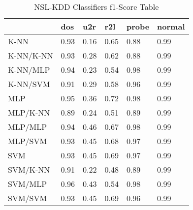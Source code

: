\begin{table}[H]
\centering
\caption{NSL-KDD Classifiers f1-Score Table}
\label{nslf1scoretable}
\begin{tabular}{@{}llllll@{}}
\toprule
          & dos  & u2r  & r2l  & probe & normal \\ \midrule
K-NN      & 0.93 & 0.16 & 0.65 & 0.88  & 0.99   \\
K-NN/K-NN & 0.93 & 0.28 & 0.62 & 0.88  & 0.99   \\
K-NN/MLP  & 0.94 & 0.23 & 0.54 & 0.98  & 0.99   \\
K-NN/SVM  & 0.91 & 0.29 & 0.58 & 0.96  & 0.99   \\
MLP       & 0.95 & 0.36 & 0.72 & 0.98  & 0.99   \\
MLP/K-NN  & 0.89 & 0.24 & 0.51 & 0.89  & 0.99   \\
MLP/MLP   & 0.94 & 0.46 & 0.67 & 0.98  & 0.99   \\
MLP/SVM   & 0.93 & 0.45 & 0.68 & 0.97  & 0.99   \\
SVM       & 0.93 & 0.45 & 0.69 & 0.97  & 0.99   \\
SVM/K-NN  & 0.91 & 0.22 & 0.48 & 0.89  & 0.99   \\
SVM/MLP   & 0.96 & 0.43 & 0.54 & 0.98  & 0.99   \\
SVM/SVM   & 0.93 & 0.45 & 0.69 & 0.96  & 0.99   \\ \bottomrule
\end{tabular}
\end{table}
